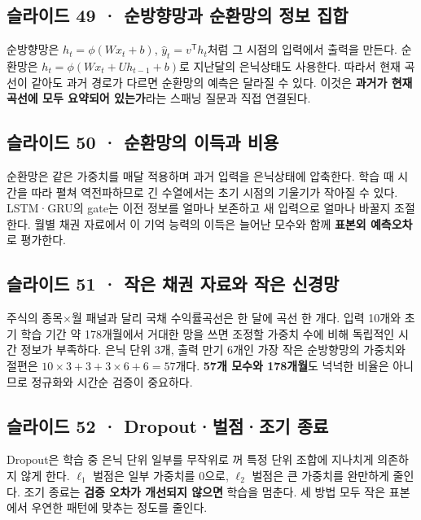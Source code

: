 \documentclass[11pt,a4paper]{article}
\begin{document}
\subsection{슬라이드 49 · 순방향망과 순환망의 정보 집합}
순방향망은 $h_t=\phi(Wx_t+b)$, $\hat y_t=v^{\mathsf T}h_t$처럼 그 시점의 입력에서 출력을 만든다. 순환망은 $h_t=\phi(Wx_t+Uh_{t-1}+b)$로 지난달의 은닉상태도 사용한다. 따라서 현재 곡선이 같아도 과거 경로가 다르면 순환망의 예측은 달라질 수 있다. 이것은 \textbf{과거가 현재 곡선에 모두 요약되어 있는가}라는 스패닝 질문과 직접 연결된다.\par

\subsection{슬라이드 50 · 순환망의 이득과 비용}
순환망은 같은 가중치를 매달 적용하며 과거 입력을 은닉상태에 압축한다. 학습 때 시간을 따라 펼쳐 역전파하므로 긴 수열에서는 초기 시점의 기울기가 작아질 수 있다. LSTM·GRU의 gate는 이전 정보를 얼마나 보존하고 새 입력으로 얼마나 바꿀지 조절한다. 월별 채권 자료에서 이 기억 능력의 이득은 늘어난 모수와 함께 \textbf{표본외 예측오차}로 평가한다.\par

\subsection{슬라이드 51 · 작은 채권 자료와 작은 신경망}
주식의 종목×월 패널과 달리 국채 수익률곡선은 한 달에 곡선 한 개다. 입력 10개와 초기 학습 기간 약 178개월에서 거대한 망을 쓰면 조정할 가중치 수에 비해 독립적인 시간 정보가 부족하다. 은닉 단위 3개, 출력 만기 6개인 가장 작은 순방향망의 가중치와 절편은 $10\times3+3+3\times6+6=57$개다. \textbf{57개 모수와 178개월}도 넉넉한 비율은 아니므로 정규화와 시간순 검증이 중요하다.\par

\subsection{슬라이드 52 · Dropout·벌점·조기 종료}
Dropout은 학습 중 은닉 단위 일부를 무작위로 꺼 특정 단위 조합에 지나치게 의존하지 않게 한다. $\ell_1$ 벌점은 일부 가중치를 0으로, $\ell_2$ 벌점은 큰 가중치를 완만하게 줄인다. 조기 종료는 \textbf{검증 오차가 개선되지 않으면} 학습을 멈춘다. 세 방법 모두 작은 표본에서 우연한 패턴에 맞추는 정도를 줄인다.\par
\end{document}
